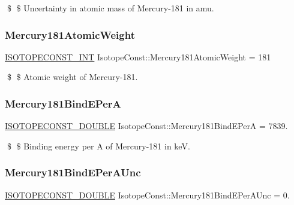 \$ \$ Uncertainty in atomic mass of Mercury-\/181 in amu. \mbox{\label{group___isotope_const-_mercury-_hg181_gad9a3fcc1b5fd5efbb18caa9456b9988f}} 
\subsubsection{\texorpdfstring{Mercury181\+Atomic\+Weight}{Mercury181AtomicWeight}}
{\footnotesize\ttfamily \mbox{\hyperlink{group___isotope_const-_macros_ga5f18360b3e99483a35c32d789e62621c}{I\+S\+O\+T\+O\+P\+E\+C\+O\+N\+S\+T\+\_\+\+I\+NT}} Isotope\+Const\+::\+Mercury181\+Atomic\+Weight = 181}

\$ \$ Atomic weight of Mercury-\/181. \mbox{\label{group___isotope_const-_mercury-_hg181_ga58bb1e10ce3a621eee6e16220cc90a46}} 
\subsubsection{\texorpdfstring{Mercury181\+Bind\+E\+PerA}{Mercury181BindEPerA}}
{\footnotesize\ttfamily \mbox{\hyperlink{group___isotope_const-_macros_ga8f45a7272ce02c0b4c65c44636ed719a}{I\+S\+O\+T\+O\+P\+E\+C\+O\+N\+S\+T\+\_\+\+D\+O\+U\+B\+LE}} Isotope\+Const\+::\+Mercury181\+Bind\+E\+PerA = 7839.}

\$ \$ Binding energy per A of Mercury-\/181 in keV. \mbox{\label{group___isotope_const-_mercury-_hg181_gaf31ed5dc8b21e22647bfd030397d0d80}} 
\subsubsection{\texorpdfstring{Mercury181\+Bind\+E\+Per\+A\+Unc}{Mercury181BindEPerAUnc}}
{\footnotesize\ttfamily \mbox{\hyperlink{group___isotope_const-_macros_ga8f45a7272ce02c0b4c65c44636ed719a}{I\+S\+O\+T\+O\+P\+E\+C\+O\+N\+S\+T\+\_\+\+D\+O\+U\+B\+LE}} Isotope\+Const\+::\+Mercury181\+Bind\+E\+Per\+A\+Unc = 0.}

